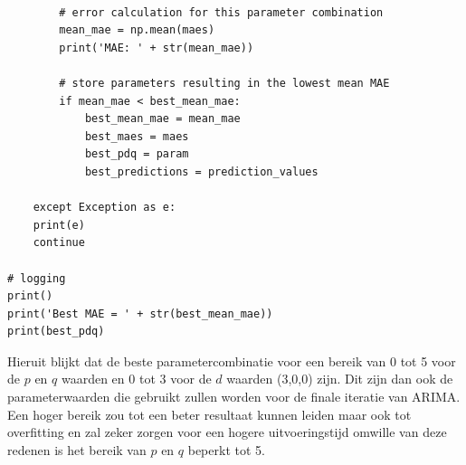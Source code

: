 \begin{verbatim}
        
        # error calculation for this parameter combination
        mean_mae = np.mean(maes)
        print('MAE: ' + str(mean_mae))    
        
        # store parameters resulting in the lowest mean MAE
        if mean_mae < best_mean_mae:
            best_mean_mae = mean_mae
            best_maes = maes
            best_pdq = param
            best_predictions = prediction_values
            
    except Exception as e:
    print(e)
    continue

# logging
print()
print('Best MAE = ' + str(best_mean_mae))
print(best_pdq)
\end{verbatim}

Hieruit blijkt dat de beste parametercombinatie voor een bereik van 0 tot 5 voor de $p$ en $q$ waarden en 0 tot 3 voor de $d$ waarden (3,0,0) zijn. Dit zijn dan ook de parameterwaarden die gebruikt zullen worden voor de finale iteratie van ARIMA. Een hoger bereik zou tot een beter resultaat kunnen leiden maar ook tot overfitting en zal zeker zorgen voor een hogere uitvoeringstijd omwille van deze redenen is het bereik van $p$ en $q$ beperkt tot 5.

